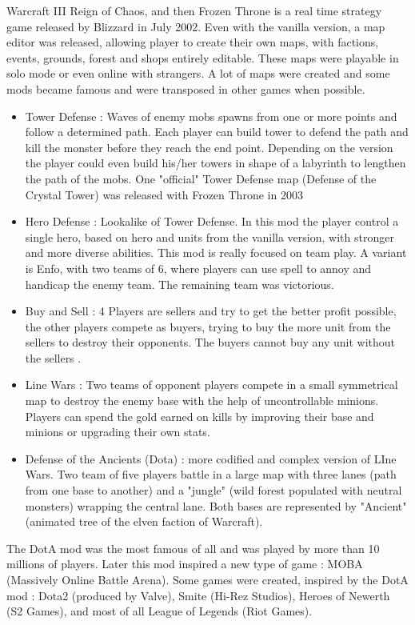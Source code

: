 \documentclass[a4paper,12pt]{article}
\begin{document}
Warcraft III Reign of Chaos, and then Frozen Throne is a real time strategy game released by Blizzard in July 2002. Even with the vanilla version, a map editor was released, allowing player to create their own maps, with factions, events, grounds, forest and shops entirely editable. These maps were playable in solo mode or even online with strangers. A lot of maps were created and some mods became famous and were transposed in other games when possible.
\begin{itemize}
\item Tower Defense : Waves of enemy mobs spawns from one or more points and follow a determined path. Each player can build tower to defend the path and kill the monster before they reach the end point. Depending on the version the player could even build his/her towers in shape of a labyrinth to lengthen the path of the mobs. One "official" Tower Defense map (Defense of the Crystal Tower) was released with Frozen Throne in 2003
\item Hero Defense : Lookalike of Tower Defense. In this mod the player control a single hero, based on hero and units from the vanilla version, with stronger and more diverse abilities. This mod is really focused on team play. A variant is Enfo, with two teams of 6, where players can use spell to annoy and handicap the enemy team. The remaining team was victorious.
\item Buy and Sell : 4 Players are sellers and try to get the better profit possible, the other players compete as buyers, trying to buy the more unit from the sellers to destroy their opponents. The buyers cannot buy any unit without the sellers .
\item Line Wars : Two teams of opponent players compete in a small symmetrical map to destroy the enemy base with the help of uncontrollable minions. Players can spend the gold earned on kills by improving their base and minions or upgrading their own stats.
\item Defense of the Ancients (Dota) : more codified and complex version of LIne Wars. Two team of five players battle in a large map with three lanes (path from one base to another) and
a "jungle" (wild forest populated with neutral monsters) wrapping the central lane. Both bases are represented by "Ancient" (animated tree of the elven faction of Warcraft).
\end{itemize}

The DotA mod was the most famous of all and was played by more than 10 millions of players. Later this mod inspired a new type of game : MOBA (Massively Online Battle Arena). Some games were created, inspired by the DotA mod : Dota2 (produced by Valve), Smite (Hi-Rez Studios), Heroes of Newerth (S2 Games), and most of all League of Legends (Riot Games).
\end{document}

